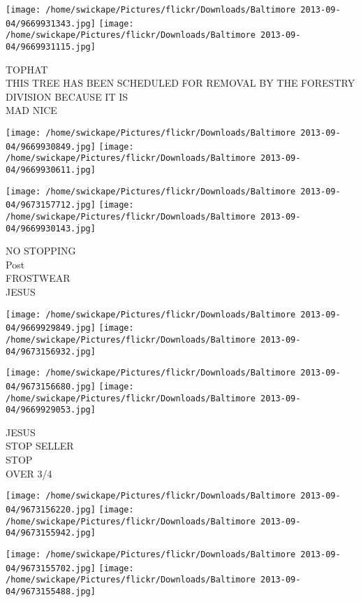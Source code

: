 \documentclass[10pt,letterpaper]{article}
\begin{document}
\vspace{0.25in}
\texttt{[image: /home/swickape/Pictures/flickr/Downloads/Baltimore 2013-09-04/9669931343.jpg]}
\texttt{[image: /home/swickape/Pictures/flickr/Downloads/Baltimore 2013-09-04/9669931115.jpg]}

TOPHAT\\
THIS TREE HAS BEEN SCHEDULED FOR REMOVAL BY THE FORESTRY DIVISION BECAUSE IT IS\\
MAD NICE\\
\pagebreak

\texttt{[image: /home/swickape/Pictures/flickr/Downloads/Baltimore 2013-09-04/9669930849.jpg]}
\texttt{[image: /home/swickape/Pictures/flickr/Downloads/Baltimore 2013-09-04/9669930611.jpg]}

\texttt{[image: /home/swickape/Pictures/flickr/Downloads/Baltimore 2013-09-04/9673157712.jpg]}
\texttt{[image: /home/swickape/Pictures/flickr/Downloads/Baltimore 2013-09-04/9669930143.jpg]}

NO STOPPING\\
Post\\
FROSTWEAR\\
JESUS\\
\pagebreak

\texttt{[image: /home/swickape/Pictures/flickr/Downloads/Baltimore 2013-09-04/9669929849.jpg]}
\texttt{[image: /home/swickape/Pictures/flickr/Downloads/Baltimore 2013-09-04/9673156932.jpg]}

\texttt{[image: /home/swickape/Pictures/flickr/Downloads/Baltimore 2013-09-04/9673156680.jpg]}
\texttt{[image: /home/swickape/Pictures/flickr/Downloads/Baltimore 2013-09-04/9669929053.jpg]}

JESUS\\
STOP SELLER\\
STOP\\
OVER 3/4\\
\pagebreak

\texttt{[image: /home/swickape/Pictures/flickr/Downloads/Baltimore 2013-09-04/9673156220.jpg]}
\texttt{[image: /home/swickape/Pictures/flickr/Downloads/Baltimore 2013-09-04/9673155942.jpg]}

\texttt{[image: /home/swickape/Pictures/flickr/Downloads/Baltimore 2013-09-04/9673155702.jpg]}
\texttt{[image: /home/swickape/Pictures/flickr/Downloads/Baltimore 2013-09-04/9673155488.jpg]}
\end{document}
